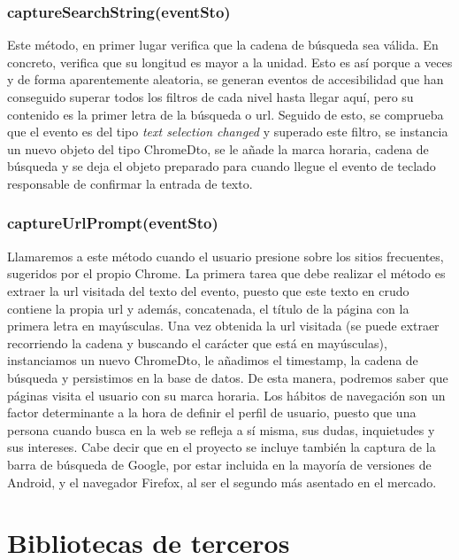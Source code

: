 \documentclass[12pt,a4paper,oneside]{book} %
\begin{document}
\subsubsection{captureSearchString(eventSto)}
Este método, en primer lugar verifica que la cadena de búsqueda sea válida. En concreto, verifica que su longitud es mayor a la unidad. Esto es así porque a veces y de forma aparentemente aleatoria, se generan eventos de accesibilidad que han conseguido superar todos los filtros de cada nivel hasta llegar aquí, pero su contenido es la primer letra de la búsqueda o url. 
\newline \newline 
Seguido de esto, se comprueba que el evento es del tipo \textit{text selection changed} y superado este filtro, se instancia un nuevo objeto del tipo ChromeDto, se le añade la marca horaria, cadena de búsqueda y se deja el objeto preparado para cuando llegue el evento de teclado responsable de confirmar la entrada de texto. 
\subsubsection{captureUrlPrompt(eventSto)}
Llamaremos a este método cuando el usuario presione sobre los sitios frecuentes, sugeridos por el propio Chrome. 
\newline \newline 
La primera tarea que debe realizar el método es extraer la url visitada del texto del evento, puesto que este texto en crudo contiene la propia url y además, concatenada, el título de la página con la primera letra en mayúsculas. 
\newline \newline 
Una vez obtenida la url visitada (se puede extraer recorriendo la cadena y buscando el carácter que está en mayúsculas), instanciamos un nuevo ChromeDto, le añadimos el timestamp, la cadena de búsqueda y persistimos en la base de datos. 
\newline \newline
De esta manera, podremos saber que páginas visita el usuario con su marca horaria. Los hábitos de navegación son un factor determinante a la hora de definir el perfil de usuario, puesto que una persona cuando busca en la web se refleja a sí misma, sus dudas, inquietudes y sus intereses. Cabe decir que en el proyecto se incluye también la captura de la barra de búsqueda de Google, por estar incluida en la mayoría de versiones de Android, y el navegador Firefox, al ser el segundo más asentado en el mercado. 
\section{Bibliotecas de terceros}
\end{document}
